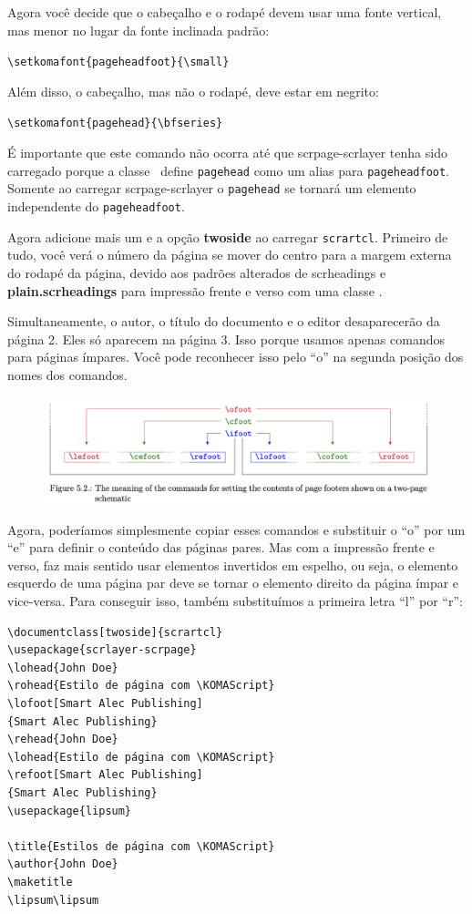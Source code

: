 Agora você decide que o cabeçalho e o rodapé devem usar uma fonte vertical, mas menor no lugar da fonte inclinada padrão:

\verb|\setkomafont{pageheadfoot}{\small}|

Além disso, o cabeçalho, mas não o rodapé, deve estar em negrito:

\verb|\setkomafont{pagehead}{\bfseries}|

É importante que este comando não ocorra até que scrpage-scrlayer tenha sido carregado porque a classe \KOMAScript\ define \texttt{pagehead} como um alias para \texttt{pageheadfoot}. Somente ao carregar scrpage-scrlayer o \texttt{pagehead} se tornará um elemento independente do \texttt{pageheadfoot}.

Agora adicione mais um  e a opção \textbf{twoside} ao carregar \texttt{scrartcl}. Primeiro de tudo, você verá o número da página se mover do centro para a margem externa do rodapé da página, devido aos padrões alterados de scrheadings e \textbf{plain.scrheadings} para impressão frente e verso com uma classe \KOMAScript.

Simultaneamente, o autor, o título do documento e o editor desaparecerão da página 2. Eles só aparecem na página 3. Isso porque usamos apenas comandos para páginas ímpares. Você pode reconhecer isso pelo “o” na segunda posição dos nomes dos comandos.

\begin{figure}[h]
    \centering
    \includegraphics[width=1\linewidth]{imagens/imagem06.png}
\end{figure}

Agora, poderíamos simplesmente copiar esses comandos e substituir o “o” por um “e” para definir o conteúdo das páginas pares. Mas com a impressão frente e verso, faz mais sentido usar elementos invertidos em espelho, ou seja, o elemento esquerdo de uma página par deve se tornar o elemento direito da página ímpar e vice-versa. Para conseguir isso, também substituímos a primeira letra “l” por “r”:
\begin{verbatim}
\documentclass[twoside]{scrartcl}
\usepackage{scrlayer-scrpage}
\lohead{John Doe}
\rohead{Estilo de página com \KOMAScript}
\lofoot[Smart Alec Publishing]
{Smart Alec Publishing}
\rehead{John Doe}
\lohead{Estilo de página com \KOMAScript}
\refoot[Smart Alec Publishing]
{Smart Alec Publishing}
\usepackage{lipsum}

\title{Estilos de página com \KOMAScript}
\author{John Doe}
\maketitle
\lipsum\lipsum

\end{verbatim}

